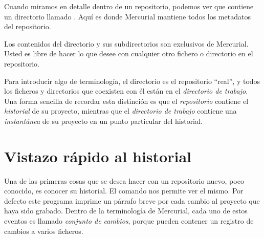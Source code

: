 Cuando miramos en detalle dentro de un repositorio, podemos ver que
contiene un directorio llamado . Aquí es donde Mercurial
mantiene todos los metadatos del repositorio.

Los contenidos del directorio  y sus subdirectorios son
exclusivos de Mercurial. Usted es libre de hacer lo que desee con
cualquier otro fichero o directorio en el repositorio.

Para introducir algo de terminología, el directorio  es
el repositorio ``real'', y todos los ficheros y directorios que
coexisten con él están en el \emph{directorio de trabajo}. Una forma
sencilla de recordar esta distinción es que el \emph{repositorio}
contiene el \emph{historial} de su proyecto, mientras que el
\emph{directorio de trabajo} contiene una \emph{instantánea} de su
proyecto en un punto particular del historial.

\section{Vistazo rápido al historial}

Una de las primeras cosas que se desea hacer con un repositorio nuevo,
poco conocido, es conocer su historial. El comando  nos
permite ver el mismo.
Por defecto este programa imprime un párrafo breve por cada cambio al
proyecto que haya sido grabado. Dentro de la terminología de
Mercurial, cada uno de estos eventos es llamado \emph{conjunto de
cambios}, porque pueden contener un registro de cambios a varios
ficheros.

